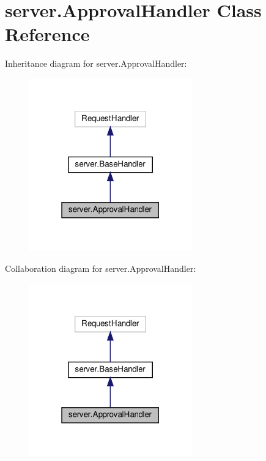 \hypertarget{classserver_1_1ApprovalHandler}{}\section{server.\+Approval\+Handler Class Reference}
\label{classserver_1_1ApprovalHandler}


Inheritance diagram for server.\+Approval\+Handler\+:
\nopagebreak
\begin{figure}[H]
\begin{center}
\leavevmode
\includegraphics[width=199pt]{classserver_1_1ApprovalHandler__inherit__graph}
\end{center}
\end{figure}


Collaboration diagram for server.\+Approval\+Handler\+:
\nopagebreak
\begin{figure}[H]
\begin{center}
\leavevmode
\includegraphics[width=199pt]{classserver_1_1ApprovalHandler__coll__graph}
\end{center}
\end{figure}
